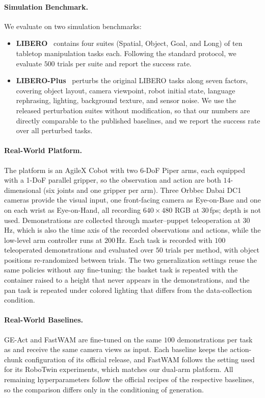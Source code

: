 \paragraph{Simulation Benchmark.}
We evaluate on two simulation benchmarks:
\begin{itemize}
    \item \textbf{LIBERO}~\cite{liu2023libero} contains four suites (Spatial,
    Object, Goal, and Long) of ten tabletop manipulation tasks each.
    Following the standard protocol, we evaluate $500$ trials per suite and
    report the success rate.
    \item \textbf{LIBERO-Plus}~\cite{liberoplus} perturbs the original LIBERO
    tasks along seven factors, covering object layout, camera viewpoint, robot
    initial state, language rephrasing, lighting, background texture, and
    sensor noise.
    We use the released perturbation suites without modification, so that our
    numbers are directly comparable to the published baselines, and we report
    the success rate over all perturbed tasks.
\end{itemize}

\paragraph{Real-World Platform.}
The platform is an AgileX Cobot with two 6-DoF Piper arms, each equipped with a
1-DoF parallel gripper, so the observation and action are both
$14$-dimensional (six joints and one gripper per arm).
Three Orbbec Dabai DC1 cameras provide the visual input, one front-facing
camera as Eye-on-Base and one on each wrist as Eye-on-Hand, all recording
$640{\times}480$ RGB at $30$\,fps; depth is not used.
Demonstrations are collected through master--puppet teleoperation at
$30$\,Hz, which is also the time axis of the recorded observations and
actions, while the low-level arm controller runs at $200$\,Hz.
Each task is recorded with $100$ teleoperated demonstrations and evaluated over
$50$ trials per method, with object positions re-randomized between trials.
The two generalization settings reuse the same policies without any fine-tuning:
the basket task is repeated with the container raised to a height that never
appears in the demonstrations, and the pan task is repeated under colored
lighting that differs from the data-collection condition.

\paragraph{Real-World Baselines.}
GE-Act and FastWAM are fine-tuned on the same $100$ demonstrations per task as
\ourmethod and receive the same camera views as input.
Each baseline keeps the action-chunk configuration of its official release, and
FastWAM follows the setting used for its RoboTwin experiments, which matches
our dual-arm platform.
All remaining hyperparameters follow the official recipes of the respective
baselines, so the comparison differs only in the conditioning of generation.



